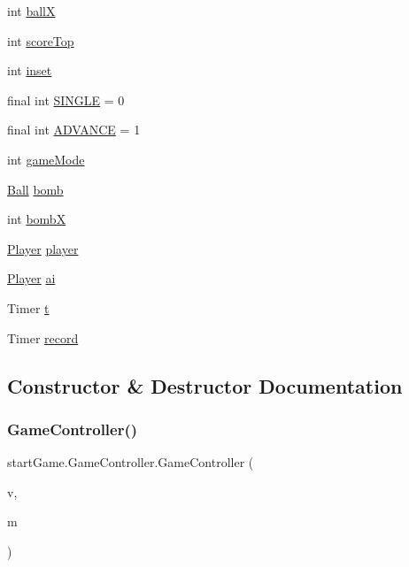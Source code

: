 \begin{DoxyCompactItemize}
\item 
int \hyperlink{classstart_game_1_1_game_controller_a122256563a1c8df92c4c9d7549f68fd3}{ballX}
\item 
int \hyperlink{classstart_game_1_1_game_controller_af55ee2997cc74f6aee8720fec11f4063}{score\+Top}
\item 
int \hyperlink{classstart_game_1_1_game_controller_a5195c030f589da53f78a185e31a5dc9a}{inset}
\item 
final int \hyperlink{classstart_game_1_1_game_controller_a38526b0e4bd8fd7078ec988678af462d}{S\+I\+N\+G\+LE} = 0
\item 
final int \hyperlink{classstart_game_1_1_game_controller_a36c6fcecafa6f7176733248a5cfb2c87}{A\+D\+V\+A\+N\+CE} = 1
\item 
int \hyperlink{classstart_game_1_1_game_controller_af029ba3e799fe940deb010e575287f55}{game\+Mode}
\item 
\hyperlink{classmodel_1_1_ball}{Ball} \hyperlink{classstart_game_1_1_game_controller_a5196356364a188386c9632e2aed1f105}{bomb}
\item 
int \hyperlink{classstart_game_1_1_game_controller_a9cb60b2c3c52a0c65fcb2480cf52f4e5}{bombX}
\item 
\hyperlink{classmodel_1_1_player}{Player} \hyperlink{classstart_game_1_1_game_controller_ad110380b2d709650ead4b69885fe920e}{player}
\item 
\hyperlink{classmodel_1_1_player}{Player} \hyperlink{classstart_game_1_1_game_controller_a21dfca701ec83511ac399a184530fc63}{ai}
\item 
Timer \hyperlink{classstart_game_1_1_game_controller_af1da0eb8171f6098d28786c5c957fcfd}{t}
\item 
Timer \hyperlink{classstart_game_1_1_game_controller_a43406d2f3c186834a759743c4c775d14}{record}
\end{DoxyCompactItemize}


\subsection{Constructor \& Destructor Documentation}
\hypertarget{classstart_game_1_1_game_controller_aecc647e49ed23b571160d7d7c68b04d7}{}\label{classstart_game_1_1_game_controller_aecc647e49ed23b571160d7d7c68b04d7} 
\subsubsection{\texorpdfstring{Game\+Controller()}{GameController()}}
{\footnotesize\ttfamily start\+Game.\+Game\+Controller.\+Game\+Controller (\begin{DoxyParamCaption}\item[{\hyperlink{classview_1_1_game_view}{Game\+View}}]{v,  }\item[{\hyperlink{classmodel_1_1_game_model}{Game\+Model}}]{m }\end{DoxyParamCaption})}

